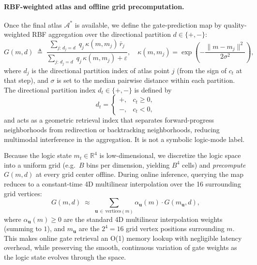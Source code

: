 \documentclass{article}
\newcommand{\R}{\mathbb{R}}
\newcommand{\eps}{\varepsilon}
\begin{document}
\paragraph{RBF-weighted atlas and offline grid precomputation.}
Once the final atlas $\mathcal{A}^*$ is available, we define the gate-prediction map by quality-weighted RBF aggregation over the directional partition $d\in\{+,-\}$:
\begin{equation}
G(m,d) \;\triangleq\;
\frac{\displaystyle\sum_{j:\,d_j=d}\; q_j\,\kappa(m,m_j)\,\bar r_j}
     {\displaystyle\sum_{j:\,d_j=d}\; q_j\,\kappa(m,m_j)+\eps},
\quad
\kappa(m,m_j)=\exp\!\left(-\frac{\|m-m_j\|^2}{2\sigma^2}\right),
\label{eq:rbf}
\end{equation}
where $d_j$ is the directional partition index of atlas point $j$ (from the sign of $c_t$ at that step), and $\sigma$ is set to the median pairwise distance within each partition. The directional partition index $d_t\in\{+,-\}$ is defined by
\[
d_t =
\begin{cases}
+, & c_t \ge 0,\\
-, & c_t < 0,
\end{cases}
\]
and acts as a geometric retrieval index that separates forward-progress neighborhoods from redirection or backtracking neighborhoods, reducing multimodal interference in the aggregation. It is not a symbolic logic-mode label.

Because the logic state $m_t\in\R^4$ is low-dimensional, we discretize the logic space into a uniform grid (e.g.\ $B$ bins per dimension, yielding $B^4$ cells) and \emph{precompute} $G(m,d)$ at every grid center offline. During online inference, querying the map reduces to a constant-time 4D multilinear interpolation over the 16 surrounding grid vertices:
\begin{equation}
G(m,d) \;\approx\; \sum_{\mathbf{u}\,\in\,\mathrm{vertices}(m)} \alpha_{\mathbf{u}}(m)\cdot G(m_{\mathbf{u}},d),
\label{eq:interp}
\end{equation}
where $\alpha_{\mathbf{u}}(m)\ge 0$ are the standard 4D multilinear interpolation weights (summing to $1$), and $m_{\mathbf{u}}$ are the $2^4=16$ grid vertex positions surrounding $m$. This makes online gate retrieval an O(1) memory lookup with negligible latency overhead, while preserving the smooth, continuous variation of gate weights as the logic state evolves through the space.

\end{document}
